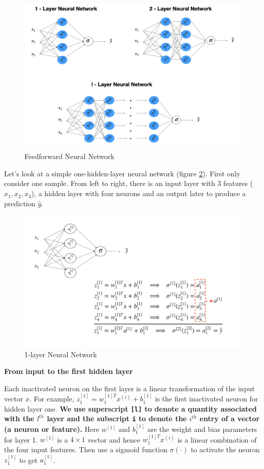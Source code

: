 \documentclass[
  12pt,
]{krantz}
\begin{document}
\begin{figure}

{\centering \includegraphics[width=0.8\linewidth]{images/dnn_str} 

}

\caption{Feedforward Neural Network}\label{fig:ffnn}
\end{figure}

Let's look at a simple one-hidden-layer neural network (figure \ref{fig:onelayernn}). First only consider one sample. From left to right, there is an input layer with 3 features (\(x_1, x_2, x_3\)), a hidden layer with four neurons and an output later to produce a prediction \(\hat{y}\).

\begin{figure}

{\centering \includegraphics[width=0.8\linewidth]{images/onelayerNN} 

}

\caption{1-layer Neural Network}\label{fig:onelayernn}
\end{figure}

\textbf{From input to the first hidden layer}

Each inactivated neuron on the first layer is a linear transformation of the input vector \(x\). For example, \(z^{[1]}_1 = w^{[1]T}_1x^{(i)} + b_1^{[1]}\) is the first inactivated neuron for hidden layer one. \textbf{We use superscript \texttt{{[}l{]}} to denote a quantity associated with the \(l^{th}\) layer and the subscript \texttt{i} to denote the \(i^{th}\) entry of a vector (a neuron or feature).} Here \(w^{[1]}\) and \(b_1^{[1]}\) are the weight and bias parameters for layer 1. \(w^{[1]}\) is a \(4 \times 1\) vector and hence \(w^{[1]T}_1x^{(i)}\) is a linear combination of the four input features. Then use a sigmoid function \(\sigma(\cdot)\) to activate the neuron \(z^{[1]}_1\) to get \(a^{[1]}_1\).
\end{document}
